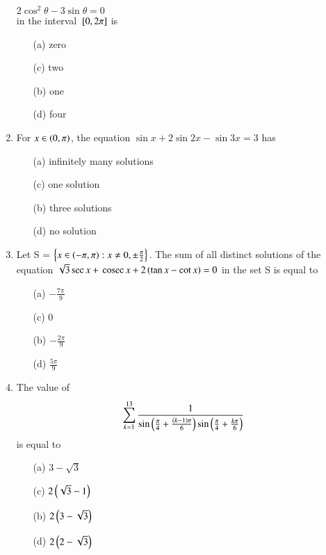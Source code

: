 \documentclass[journal,12pt,twocolumn,article]{IEEEtran}
\theoremstyle{remark}
\begin{document}
\begin{enumerate}[start = 20]
$2\cos^2\theta - 3\sin\theta = 0$\\
in the interval ${}\left[0,2\pi\right]$ is
\hfill{}
\begin{multicols}{2}
\begin{enumerate}
\item[(a)] zero
\item[(c)] two
\columnbreak
\item[(b)] one
\item[(d)] four
\end{enumerate}
\end{multicols}
\item For $x \in \left(0,\pi\right)$, the equation $\sin x + 2\sin 2x - \sin 3x = 3$ has
\hfill{}
\begin{multicols}{2}
\begin{enumerate}
\item[(a)] infinitely many solutions
\item[(c)] one solution
\columnbreak
\item[(b)] three solutions
\item[(d)] no solution
\end{enumerate}
\end{multicols}
\item Let S = $\left\{x \in \left(-\pi,\pi\right) : x \neq 0, \pm \frac{\pi}{2}\right\}$. The sum of all distinct solutions of the equation $\sqrt{3} \sec x + \,\text{cosec}\, x + 2\left(\tan x - \cot x\right) = 0$ in the set S is equal to
\hfill{}
\begin{multicols}{2}
\begin{enumerate}
\item[(a)] $-\frac{7\pi}{9}$
\item[(c)] 0
\columnbreak
\item[(b)] $-\frac{2\pi}{9}$
\item[(d)] $\frac{5\pi}{9}$
\end{enumerate}
\end{multicols}
\item The value of 
\begin{align*}
\sum_{k=1}^{13} \frac{1}{\sin\left(\frac{\pi}{4} + \frac{\left(k-1\right)\pi}{6}\right)\sin\left(\frac{\pi}{4} + \frac{k\pi}{6}\right)}
\end{align*}
is equal to
\hfill{}
\begin{multicols}{2}
\begin{enumerate}
\item[(a)] $3-\sqrt{3}$
\item[(c)] $2\left(\sqrt{3}-1\right)$
\columnbreak
\item[(b)] $2\left(3-\sqrt{3}\right)$
\item[(d)] $2\left(2-\sqrt{3}\right)$
\end{enumerate}
\end{multicols}
\end{enumerate}
\end{document}
